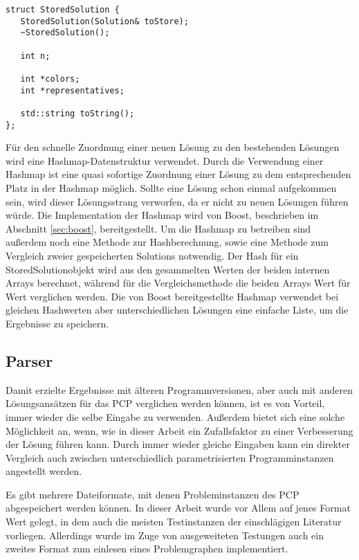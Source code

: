 \singlespacing
\begin{lstlisting}[caption={Die Signatur von StoredSolution},label={lst:stored}]
struct StoredSolution {
   StoredSolution(Solution& toStore);
   ~StoredSolution();
   
   int n;
   
   int *colors;
   int *representatives;
   
   std::string toString();
};
\end{lstlisting}

Für den schnelle Zuordnung einer neuen Lösung zu den bestehenden Lösungen wird eine Hashmap-Datenstruktur verwendet. Durch die Verwendung einer
Hashmap ist eine quasi sofortige Zuordnung einer Lösung zu dem entsprechenden Platz in der Hashmap möglich. Sollte eine Lösung schon einmal 
aufgekommen sein, wird dieser Lösungsstrang verworfen, da er nicht zu neuen Lösungen führen würde. Die Implementation der Hashmap wird von 
Boost, beschrieben im Abschnitt \ref{sec:boost}, bereitgestellt. Um die Hashmap zu betreiben sind außerdem noch eine Methode zur Hashberechnung,
sowie eine Methode zum Vergleich zweier gespeicherten Solutions notwendig. Der Hash für ein StoredSolutionobjekt wird aus den gesammelten Werten
der beiden internen Arrays berechnet, während für die Vergleichsmethode die beiden Arrays Wert für Wert verglichen werden. Die von Boost 
bereitgestellte Hashmap verwendet bei gleichen Hashwerten aber unterschiedlichen Lösungen eine einfache Liste, um die Ergebnisse zu speichern.

\subsection{Parser}
\label{sec:parser}

Damit erzielte Ergebnisse mit älteren Programmversionen, aber auch mit anderen Lösungsansätzen für das PCP verglichen werden können, ist es von
Vorteil, immer wieder die selbe Eingabe zu verwenden. Außerdem bietet sich eine solche Möglichkeit an, wenn, wie in dieser Arbeit ein Zufallsfaktor
zu einer Verbesserung der Lösung führen kann. Durch immer wieder gleiche Eingaben kann ein direkter Vergleich auch zwischen unterschiedlich
parametrisierten Programminstanzen angestellt werden.

Es gibt mehrere Dateiformate, mit denen Probleminstanzen des PCP abgespeichert werden können. In dieser Arbeit wurde vor Allem auf jenes
Format Wert gelegt, in dem auch die meisten Testinstanzen der einschlägigen Literatur vorliegen. Allerdings wurde im Zuge von ausgeweiteten 
Testungen auch ein zweites Format zum einlesen eines Problemgraphen implementiert. 

